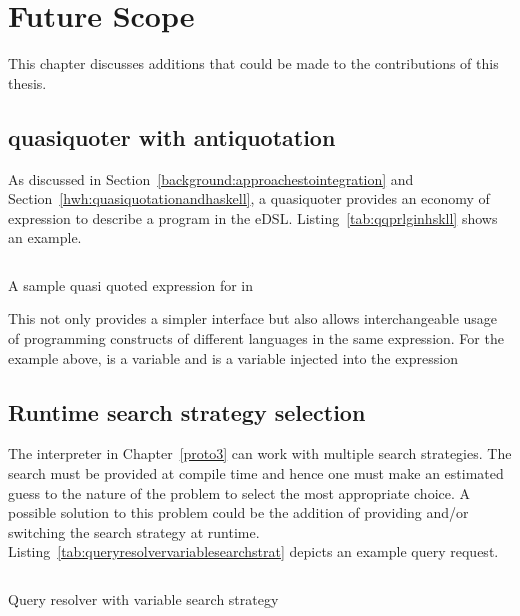 \documentclass[thesis-solanki.tex]{subfiles}
\begin{document}
\chapter{Future Scope}\label{chap:futureScope}

This chapter discusses additions that could be made to the contributions of this thesis.


\section{ quasiquoter with antiquotation}
As discussed in Section~\ref{background:approachestointegration} and Section~\ref{hwh:quasiquotationandhaskell}, a
quasiquoter provides an economy of expression to describe a program in the eDSL.
Listing~\ref{tab:qqprlginhskll} shows an example.

\begin{code-list}[H]
\begin{singlespace}
\inputminted{haskell}{haskell-proto4-qq-prlg-in-hskll.hs}
\end{singlespace}
\caption{A sample quasi quoted expression for  in }
\label{tab:qqprlginhskll}
\end{code-list}

This not only provides a simpler interface but also allows interchangeable usage of programming constructs of
different languages in the same expression.
For the example above,  is a  variable and  is a
 variable injected into the expression

\section{Runtime search strategy selection}
The  interpreter in Chapter~\ref{proto3} can work with multiple search strategies.
The search must be provided at compile time and hence one must make an estimated guess to the nature of the problem
to select the most appropriate choice.
A possible solution to this problem could be the addition of providing and/or switching the search strategy at
runtime.
Listing~\ref{tab:queryresolvervariablesearchstrat} depicts an example query request.

\begin{code-list}[H]
\begin{singlespace}
\inputminted{haskell}{haskell-proto4-query-resolver-variable-search-strat.hs}
\end{singlespace}
\caption{Query resolver with variable search strategy}
\label{tab:queryresolvervariablesearchstrat}
\end{code-list}  
\end{document}
